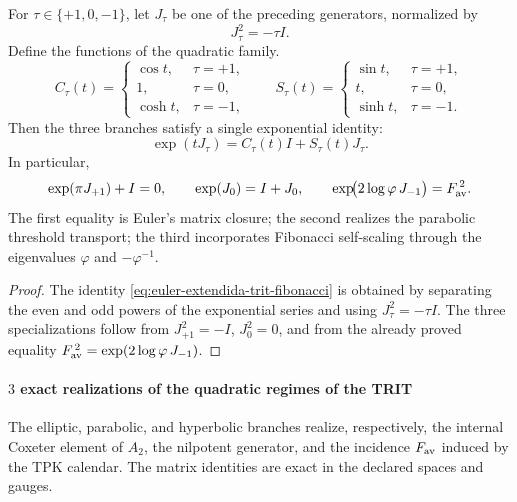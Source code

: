 \begin{corollary}
\label{cor:euler-extendida-trit-fibonacci}
For \(\tau\in\{+1,0,-1\}\), let \(J_\tau\) be one of the preceding generators, normalized by
\[
 J_\tau^2=-\tau I.
\]
Define the functions of the quadratic family.
\[
 C_\tau(t)=
 \begin{cases}
  \cos t,&\tau=+1,\\
  1,&\tau=0,\\
  \cosh t,&\tau=-1,
 \end{cases}
 \qquad
 S_\tau(t)=
 \begin{cases}
  \sin t,&\tau=+1,\\
  t,&\tau=0,\\
  \sinh t,&\tau=-1.
 \end{cases}
\]
Then the three branches satisfy a single exponential identity:
\begin{equation}
 \boxed{\exp(tJ_\tau)=C_\tau(t)I+S_\tau(t)J_\tau.}
 \label{eq:euler-extendida-trit-fibonacci}
\end{equation}
In particular,
\[
 \exp(\pi J_{+1})+I=0,
 \qquad
 \exp(J_0)=I+J_0,
 \qquad
 \exp\!\bigl(2\log\varphi\,J_{-1}\bigr)=F_{\rm av}^{\,2}.
\]
The first equality is Euler's matrix closure; the second realizes the
parabolic threshold transport; the third incorporates Fibonacci
self-scaling through the eigenvalues \(\varphi\) and \(-\varphi^{-1}\).
\end{corollary}

\begin{proof}
The identity \eqref{eq:euler-extendida-trit-fibonacci} is obtained by separating
the even and odd powers of the exponential series and using
\(J_\tau^2=-\tau I\). The three specializations follow from
\(J_{+1}^2=-I\), \(J_0^2=0\), and from the already proved equality
\(F_{\rm av}^{\,2}=\exp(2\log\varphi\,J_{-1})\).
\end{proof}

\paragraph{\(3\) exact realizations of the quadratic regimes of the TRIT}
The elliptic, parabolic, and hyperbolic branches realize, respectively, the
internal Coxeter element of \(A_2\), the nilpotent generator, and the incidence
\(F_{\rm av}\) induced by the TPK calendar. The matrix identities
are exact in the declared spaces and gauges.

